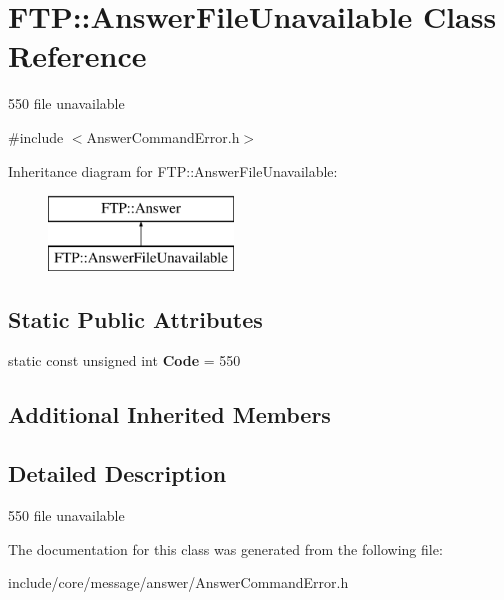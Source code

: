 \hypertarget{class_f_t_p_1_1_answer_file_unavailable}{\section{F\-T\-P\-:\-:Answer\-File\-Unavailable Class Reference}
\label{class_f_t_p_1_1_answer_file_unavailable}
}


550 file unavailable  




{\ttfamily \#include $<$Answer\-Command\-Error.\-h$>$}

Inheritance diagram for F\-T\-P\-:\-:Answer\-File\-Unavailable\-:\begin{figure}[H]
\begin{center}
\leavevmode
\includegraphics[height=2.000000cm]{class_f_t_p_1_1_answer_file_unavailable}
\end{center}
\end{figure}
\subsection*{Static Public Attributes}
\begin{DoxyCompactItemize}
\item 
\hypertarget{class_f_t_p_1_1_answer_file_unavailable_adf574d290aa6e1609cce557f7d54515f}{static const unsigned int {\bfseries Code} = 550}\label{class_f_t_p_1_1_answer_file_unavailable_adf574d290aa6e1609cce557f7d54515f}

\end{DoxyCompactItemize}
\subsection*{Additional Inherited Members}


\subsection{Detailed Description}
550 file unavailable 

The documentation for this class was generated from the following file\-:\begin{DoxyCompactItemize}
\item 
include/core/message/answer/Answer\-Command\-Error.\-h\end{DoxyCompactItemize}
